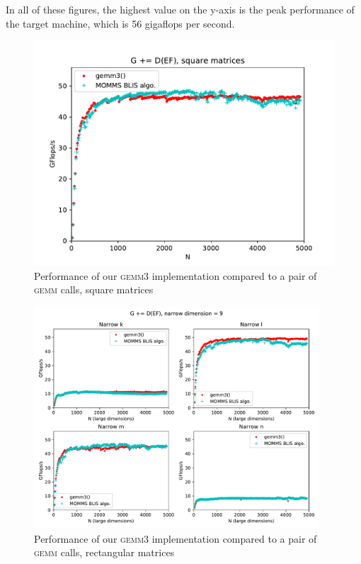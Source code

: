 \documentclass[12pt]{article}
\newcommand*{\gemmt}{{\textsc{gemm3}}}
\newcommand*{\gemm}{{\textsc{gemm}}}
\begin{document}
In all of these figures, the highest value on the y-axis is the peak performance of the target machine, which is 56 gigaflops per second.
\begin{figure}
  \centering
  \includegraphics[height=0.40\textheight]{../results/earwig2/gemm3}
  \caption{Performance of our \gemmt{} implementation compared to a pair of \gemm{} calls, square matrices}
  \label{fig:bc_square}
\end{figure}

\begin{figure}[bt]
  \centering
  \includegraphics[width=0.95\textwidth]{../results/earwig2/gemm3_rectangles}
  \caption{Performance of our \gemmt{} implementation compared to a pair of \gemm{} calls, rectangular matrices}
  \label{fig:bc_rectangles}
\end{figure}
\end{document}

